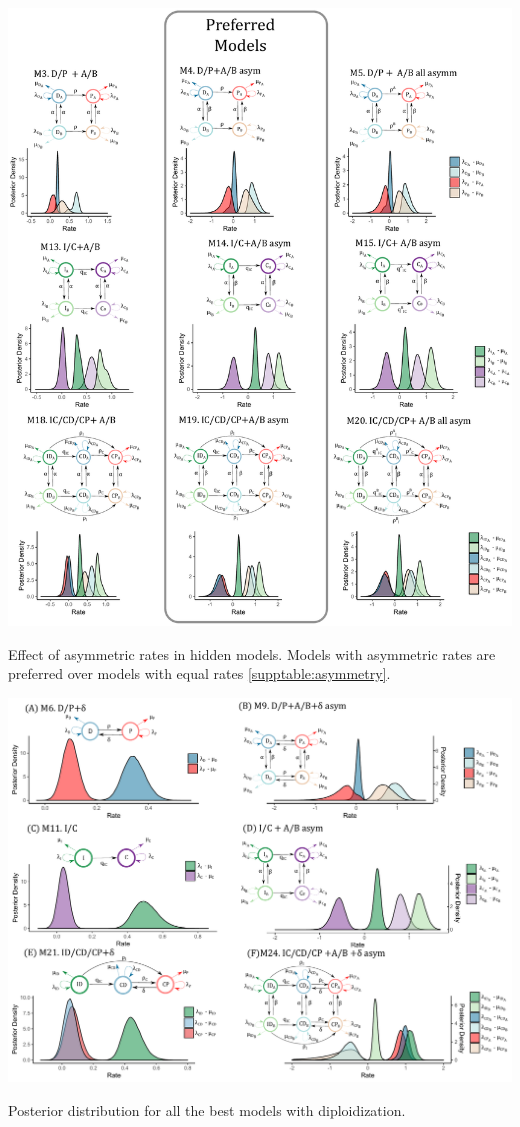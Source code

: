 \begin{suppfigure}
\includegraphics[width=\textwidth]{effectofasymmetry.pdf}
\caption{Effect of asymmetric rates in hidden models. Models with asymmetric rates are preferred over models with equal rates \cref{supptable:asymmetry}. } %
\label{suppfigure:asymmetric}
\end{suppfigure}

\begin{suppfigure}
\includegraphics[width=\textwidth]{alldiversificationasymhiddendip.pdf}
\caption{Posterior distribution for all the best models with diploidization.} %
\label{suppfigure:alldip}
\end{suppfigure}

